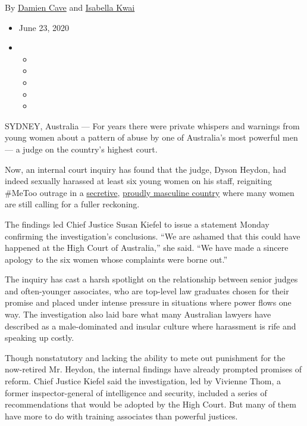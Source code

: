 By \href{https://www.nytimes.com/by/damien-cave}{Damien Cave} and
\href{https://www.nytimes.com/by/isabella-kwai}{Isabella Kwai}

\begin{itemize}
\item
  June 23, 2020
\item
  \begin{itemize}
  \item
  \item
  \item
  \item
  \item
  \end{itemize}
\end{itemize}

SYDNEY, Australia --- For years there were private whispers and warnings
from young women about a pattern of abuse by one of Australia's most
powerful men --- a judge on the country's highest court.

Now, an internal court inquiry has found that the judge, Dyson Heydon,
had indeed sexually harassed at least six young women on his staff,
reigniting \#MeToo outrage in a
\href{https://www.nytimes.com/2019/06/05/world/australia/journalist-raids.html}{secretive},
\href{https://www.nytimes.com/2019/02/26/world/australia/australia-sex-abuse-secrecy.html}{proudly
masculine country} where many women are still calling for a fuller
reckoning.

The findings led Chief Justice Susan Kiefel to issue a statement Monday
confirming the investigation's conclusions. ``We are ashamed that this
could have happened at the High Court of Australia,'' she said. ``We
have made a sincere apology to the six women whose complaints were borne
out.''

The inquiry has cast a harsh spotlight on the relationship between
senior judges and often-younger associates, who are top-level law
graduates chosen for their promise and placed under intense pressure in
situations where power flows one way. The investigation also laid bare
what many Australian lawyers have described as a male-dominated and
insular culture where harassment is rife and speaking up costly.

Though nonstatutory and lacking the ability to mete out punishment for
the now-retired Mr. Heydon, the internal findings have already prompted
promises of reform. Chief Justice Kiefel said the investigation, led by
Vivienne Thom, a former inspector-general of intelligence and security,
included a series of recommendations that would be adopted by the High
Court. But many of them have more to do with training associates than
powerful justices.

